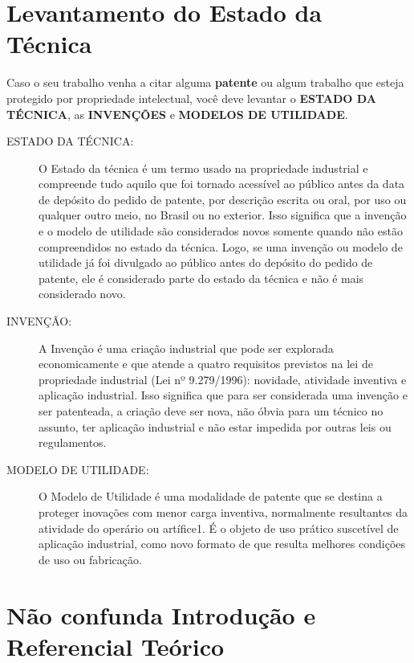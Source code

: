 \section{Levantamento do Estado da Técnica}

Caso o seu trabalho venha a citar alguma {\bf patente} ou algum trabalho que esteja protegido por {propriedade intelectual}, você deve levantar o \textbf{ESTADO DA TÉCNICA}, as \textbf{INVENÇÕES} e \textbf{MODELOS DE UTILIDADE}.

\begin{description}
    \item [ESTADO DA TÉCNICA:] O Estado da técnica é um termo usado na propriedade industrial e compreende tudo aquilo que foi tornado acessível ao público antes da data de depósito do pedido de patente, por descrição escrita ou oral, por uso ou qualquer outro meio, no Brasil ou no exterior. Isso significa que a invenção e o modelo de utilidade são considerados novos somente quando não estão compreendidos no estado da técnica.
    Logo, se uma invenção ou modelo de utilidade já foi divulgado ao público antes do depósito do pedido de patente, ele é considerado parte do estado da técnica e não é mais considerado novo.
    
    \item[INVENÇÃO:] A Invenção é uma criação industrial que pode ser explorada economicamente e que atende a quatro requisitos previstos na lei de propriedade industrial (Lei nº 9.279/1996): novidade, atividade inventiva e aplicação industrial. Isso significa que para ser considerada uma invenção e ser patenteada, a criação deve ser nova, não óbvia para um técnico no assunto, ter aplicação industrial e não estar impedida por outras leis ou regulamentos.
    
    \item[MODELO DE UTILIDADE:] O Modelo de Utilidade é uma modalidade de patente que se destina a proteger inovações com menor carga inventiva, normalmente resultantes da atividade do operário ou artífice1. É o objeto de uso prático suscetível de aplicação industrial, como novo formato de que resulta melhores condições de uso ou fabricação.
\end{description}


\section{Não confunda Introdução e  Referencial Teórico}

